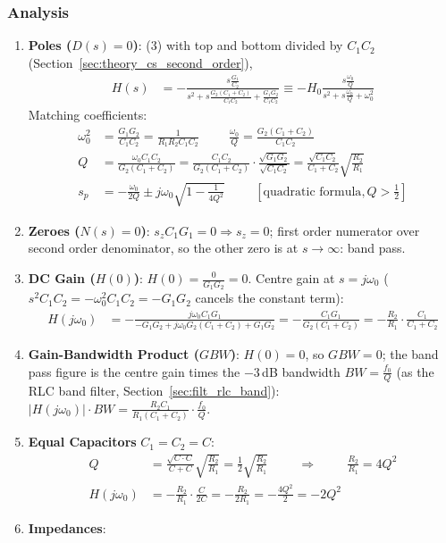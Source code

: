 \subsubsection{Analysis}
\begin{enumerate}
  \item \textbf{Poles (\(D(s) = 0\))}: (3) with top and bottom divided by \(C_1 C_2\)
    (Section~\ref{sec:theory_cs_second_order}),
    \begin{align*}
      H(s) &= -\frac{s\frac{G_1}{C_2}}{s^2 + s\frac{G_2 (C_1 + C_2)}{C_1 C_2} + \frac{G_1 G_2}{C_1 C_2}}
      \equiv -H_0\frac{s\frac{\omega_0}{Q}}{s^2 + s\frac{\omega_0}{Q} + \omega_0^2} \tag{4}
    \end{align*}
    Matching coefficients:
    \begin{align*}
      \omega_0^2 &= \frac{G_1 G_2}{C_1 C_2} = \frac{1}{R_1 R_2 C_1 C_2} \hspace{1cm}
      \frac{\omega_0}{Q} = \frac{G_2 (C_1 + C_2)}{C_1 C_2} \\
      Q &= \frac{\omega_0 C_1 C_2}{G_2 (C_1 + C_2)} = \frac{C_1 C_2}{G_2 (C_1 + C_2)}\cdot\frac{\sqrt{G_1 G_2}}{\sqrt{C_1 C_2}}
         = \frac{\sqrt{C_1 C_2}}{C_1 + C_2}\sqrt{\frac{R_2}{R_1}} \\
      s_p &= -\frac{\omega_0}{2Q} \pm j\omega_0\sqrt{1 - \frac{1}{4Q^2}} \hspace{1cm} [\text{quadratic formula}, Q > \tfrac{1}{2}]
    \end{align*}
  \item \textbf{Zeroes (\(N(s) = 0\))}: \(s_z C_1 G_1 = 0 \Rightarrow s_z = 0\); first order numerator over
    second order denominator, so the other zero is at \(s \to \infty\): band pass.
  \item \textbf{DC Gain (\(H(0)\))}: \(H(0) = \frac{0}{G_1 G_2} = 0\). Centre gain at \(s = j\omega_0\)
    (\(s^2 C_1 C_2 = -\omega_0^2 C_1 C_2 = -G_1 G_2\) cancels the constant term):
    \begin{align*}
      H(j\omega_0) &= -\frac{j\omega_0 C_1 G_1}{-G_1 G_2 + j\omega_0 G_2 (C_1 + C_2) + G_1 G_2}
       = -\frac{C_1 G_1}{G_2 (C_1 + C_2)} = -\frac{R_2}{R_1}\cdot\frac{C_1}{C_1 + C_2}
    \end{align*}
  \item \textbf{Gain-Bandwidth Product (\(GBW\))}: \(H(0) = 0\), so \(GBW = 0\); the band pass figure is
    the centre gain times the \(-3\,\)dB bandwidth \(BW = \frac{f_0}{Q}\) (as the RLC band filter,
    Section~\ref{sec:filt_rlc_band}):
    \(|H(j\omega_0)| \cdot BW = \frac{R_2 C_1}{R_1(C_1 + C_2)}\cdot\frac{f_0}{Q}\).
  \item \textbf{Equal Capacitors} \(C_1 = C_2 = C\):
    \begin{align*}
      Q &= \frac{\sqrt{C \cdot C}}{C + C}\sqrt{\frac{R_2}{R_1}} = \frac{1}{2}\sqrt{\frac{R_2}{R_1}}
      \hspace{1cm} \Rightarrow \hspace{1cm} \frac{R_2}{R_1} = 4Q^2 \\
      H(j\omega_0) &= -\frac{R_2}{R_1}\cdot\frac{C}{2C} = -\frac{R_2}{2R_1} = -\frac{4Q^2}{2} = -2Q^2
    \end{align*}
  \item \textbf{Impedances}:

\end{enumerate}
